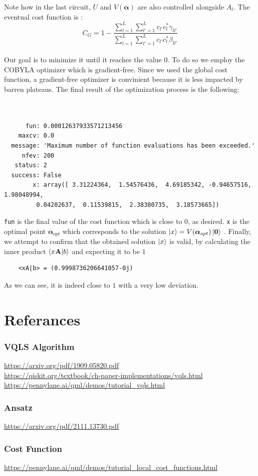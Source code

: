 \documentclass[12pt]{article}
\begin{document}
Note how in the last circuit, $U$ and $V({\boldsymbol{ \alpha}})$ are also controlled alongside $A_l$. The eventual cost function is :
 $$ C_G = 1 - \frac{\sum_{l = 1}^{L}\sum_{l' = 1}^{L}c_{l'} c_l^* \gamma_{ll'}}
 {\sum_{l = 1}^{L}\sum_{l' = 1}^{L}c_{l'} c_l^* \beta_{ll'}} $$\\
Our goal is to minimize it until it reaches the value $0$. To do so we employ the COBYLA optimizer which is gradient-free. Since we used the global cost function, a gradient-free optimizer 
is convinient because it is less impacted by barren plateaus. The final result of the optimization process is the following:\\ \\ \\  
\begin{verbatim}
      fun: 0.00012637933571213456
    maxcv: 0.0
  message: 'Maximum number of function evaluations has been exceeded.'
     nfev: 200
   status: 2
  success: False
        x: array([ 3.31224364,  1.54576436,  4.69185342, -0.94657516,  1.98048994,
         0.04202637,  0.11539815,  2.38380735,  3.18573665])
\end{verbatim}
\verb{fun{ is the final value of the cost function which is close to $0$, as desired. 
\verb{x{ is the optimal point $\boldsymbol{\alpha}_{opt} $ which corresponds to the solution $\ket{x} = V(\boldsymbol{\alpha}_{opt})\ket{\bf 0}$ .
Finally, we attempt to confirm that the obtained solution $\ket{x}$ is valid, by calculating the inner product $\braket{x{\bf A}|b}$ and expecting it to be $1$ 
\begin{verbatim}
    <xA|b> = (0.9998736206641057-0j)
\end{verbatim}    
As we can see, it is indeed close to $1$ with a very low deviation.

\section*{Referances}
\subsubsection*{VQLS Algorithm}
\url{https://arxiv.org/pdf/1909.05820.pdf}\\
\url{https://qiskit.org/textbook/ch-paper-implementations/vqls.html}\\
\url{https://pennylane.ai/qml/demos/tutorial_vqls.html}

\subsubsection*{Ansatz}
\url{https://arxiv.org/pdf/2111.13730.pdf}

\subsubsection*{Cost Function}
\url{https://pennylane.ai/qml/demos/tutorial_local_cost_functions.html}
\end{document}
